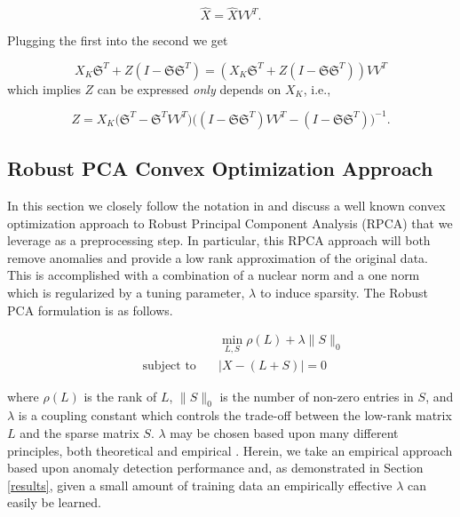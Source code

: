 \documentclass[conference]{IEEEtran}
\begin{document}
$$
\hat{X} = \hat{X} V V^T.
$$

\noindent Plugging the first into the second we get

$$
X_K \mathfrak{S}^T + Z (I-\mathfrak{S} \mathfrak{S}^T) = (X_K \mathfrak{S}^T + Z (I-\mathfrak{S} \mathfrak{S}^T)) V V^T 
$$
which implies $Z$ can be expressed \emph{only} depends on $X_K$, i.e.,

$$Z= X_K \bigg(\mathfrak{S}^T - \mathfrak{S}^T V V^T\bigg) \bigg((I-\mathfrak{S} \mathfrak{S}^T)V V^T - (I-\mathfrak{S} \mathfrak{S}^T)\bigg)^{-1}.$$ 
%
%
%
%
%


\subsection{Robust PCA Convex Optimization Approach}

In this section we closely follow the notation in \cite{Paffenroth2012a,Paffenroth2013b,paffenroth2018robust}
and discuss a well known convex optimization approach to Robust Principal Component Analysis (RPCA) that we leverage as a preprocessing step.
In particular, this RPCA approach will both remove anomalies and provide a low rank approximation of the original data. This is accomplished with a combination of a nuclear norm and a one norm which is regularized by a tuning parameter, $\lambda$ to induce sparsity. The Robust PCA formulation is as follows.

\begin{align} \label{RPCA}
  &\min_{L,S}\rho(L)+\lambda\|S\|_{0}\\ \nonumber
  \qquad \text{subject to} \quad &
                                   |X-(L+S)| = 0
\end{align}

\noindent where $\rho(L)$ is the rank of $L$, $\|S\|_{0}$ is the
number of non-zero entries in $S$, and $\lambda$ is a coupling
constant which controls the trade-off between the low-rank matrix $L$
and the sparse matrix $S$.  $\lambda$ may be chosen based upon many different principles, both theoretical and empirical \cite{Candes2011,Paffenroth2012a,Paffenroth2013b,paffenroth2018robust}.  Herein, we take an empirical approach based upon anomaly detection performance and, as demonstrated in Section \ref{results}, given a small amount of training data an empirically effective $\lambda$ can easily be learned.
\end{document}
